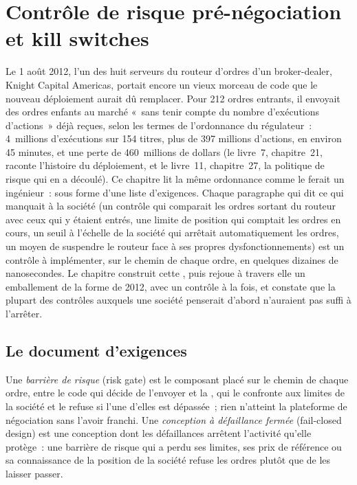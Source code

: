 \chapter{Contrôle de risque pré-négociation et kill switches}\label{ch:ll:pre-trade-risk-and-kill-switches}

Le 1 août 2012, l'un des huit serveurs du routeur d'ordres d'un broker-dealer, Knight Capital Americas, portait encore un vieux
morceau de code que le nouveau déploiement aurait dû remplacer. Pour 212 ordres entrants, il envoyait des ordres enfants au marché «~sans
tenir compte du nombre d'exécutions d'actions~» déjà reçues, selon les termes de l'ordonnance du régulateur~: 4~millions d'exécutions sur 154
titres, plus de 397 millions d'actions, en environ 45 minutes, et une perte de 460~millions de dollars (le livre~7, chapitre~21, raconte l'histoire
du déploiement, et le livre~11, chapitre~27, la politique de risque qui en a découlé). Ce chapitre lit la même ordonnance comme
le ferait un ingénieur~: sous forme d'une liste d'exigences. Chaque paragraphe qui dit ce qui manquait à la société (un contrôle qui comparait les ordres
sortant du routeur avec ceux qui y étaient entrés, une limite de position qui comptait les ordres en cours, un seuil à l'échelle de la société qui
arrêtait automatiquement les ordres, un moyen de suspendre le routeur face à ses propres dysfonctionnements) est un contrôle à implémenter, sur le chemin de chaque
ordre, en quelques dizaines de nanosecondes. Le chapitre construit cette , puis rejoue à travers elle un emballement de la forme de 2012, avec
un contrôle à la fois, et constate que la plupart des contrôles auxquels une société penserait d'abord n'auraient pas suffi à l'arrêter.

\section{Le document d'exigences}

\begin{definition}\label{def:ll:pre-trade-risk-and-kill-switches:gate}
Une \emph{barrière de risque} (risk gate) est le composant placé sur le chemin de chaque ordre, entre le code qui décide de l'envoyer et
la , qui le confronte aux limites de la société et le refuse si l'une d'elles est dépassée~; rien n'atteint la plateforme de négociation
sans l'avoir franchi. Une \emph{conception à défaillance fermée} (fail-closed design) est une conception dont les défaillances arrêtent l'activité qu'elle protège~:
une barrière de risque qui a perdu ses limites, ses prix de référence ou sa connaissance de la position de la société refuse les ordres plutôt
que de les laisser passer.
\end{definition}

